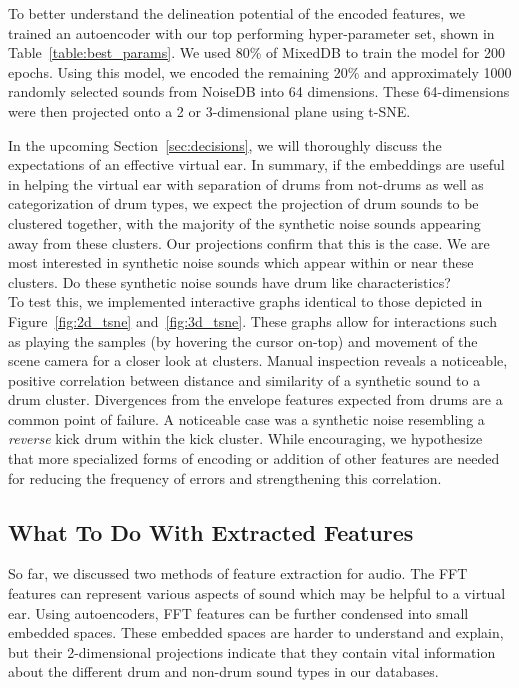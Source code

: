 \documentclass[\main/thesis.tex]{subfiles}
\begin{document}
To better understand the delineation potential of the encoded features,  we trained an autoencoder with our top performing hyper-parameter set, shown in Table~\ref{table:best_params}. We used 80\% of MixedDB to train the model for 200 epochs. Using this model, we encoded the remaining 20\% and approximately 1000 randomly selected sounds from NoiseDB into 64 dimensions. These 64-dimensions were then projected onto a 2 or 3-dimensional plane using t-SNE. 

In the upcoming Section~\ref{sec:decisions}, we will thoroughly discuss the expectations of an effective virtual ear. In summary, if the embeddings are useful in helping the virtual ear with separation of drums from not-drums as well as categorization of drum types, we expect the projection of drum sounds to be clustered together, with the majority of the synthetic noise sounds appearing away from these clusters. Our projections confirm that this is the case. We are most interested in synthetic noise sounds which appear within or near these clusters. Do these synthetic noise sounds have drum like characteristics?\\ 

To test this, we implemented interactive graphs identical to those depicted in Figure~\ref{fig:2d_tsne} and~\ref{fig:3d_tsne}. These graphs allow for interactions such as playing the samples (by hovering the cursor on-top) and movement of the scene camera for a closer look at clusters.  Manual inspection reveals a noticeable, positive correlation between distance and similarity of a synthetic sound to a drum cluster. Divergences from the envelope features expected from drums are a common point of failure. A noticeable case was a synthetic noise resembling a \emph{reverse} kick drum within the kick cluster. While encouraging, we hypothesize that more specialized forms of encoding or addition of other features are needed for reducing the frequency of errors and strengthening this correlation.
\subsection{What To Do With Extracted Features}
So far, we discussed two methods of feature extraction for audio. The FFT features can represent various aspects of sound which may be helpful to a virtual ear. Using autoencoders, FFT features can be further condensed into small embedded spaces. These embedded spaces are harder to understand and explain, but their 2-dimensional projections indicate that they contain vital information about the different drum and non-drum sound types in our databases. 
\end{document}
